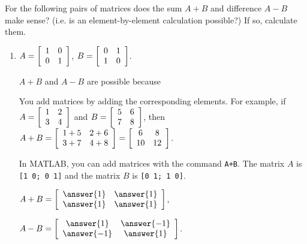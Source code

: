 \documentclass{ximera}
\author{Zack Reed}
\begin{document}
\begin{exercise}
    For the following pairs of matrices does the sum $A+B$ and difference $A-B$ make sense? (i.e. is an element-by-element calculation possible?) If so, calculate them.
    \begin{enumerate}
    \item
      $A = \startmat{cc}
        1 & 0 \\
        0 & 1
      \stopmat$,\quad
      $B = \startmat{cc}
        0 & 1 \\
        1 & 0
      \stopmat$.
  
      
  
        $A+B$ and $A-B$ are  possible because 
  
        \begin{selectAll}
        \end{selectAll}

        \begin{hint}
        
          You add matrices by adding the corresponding elements. For example, if $A = \startmat{cc} 1 & 2 \\ 3 & 4 \stopmat$ and $B = \startmat{cc} 5 & 6 \\ 7 & 8 \stopmat$, then $A+B = \startmat{cc} 1+5 & 2+6 \\ 3+7 & 4+8 \stopmat = \startmat{cc} 6 & 8 \\ 10 & 12 \stopmat$.

          In MATLAB, you can add matrices with the command \texttt{A+B}. The matrix $A$ is \texttt{[1 0; 0 1]} and the matrix $B$ is \texttt{[0 1; 1 0]}.

        \end{hint}
  
        $A+B = \startmat{cc}
          \answer{1} & \answer{1} \\
          \answer{1} & \answer{1}
        \stopmat$,\quad
  
        $A-B = \startmat{cc}
          \answer{1} & \answer{-1} \\
          \answer{-1} & \answer{1}
        \stopmat$.
  

\end{enumerate}
\end{exercise}
\end{document}
